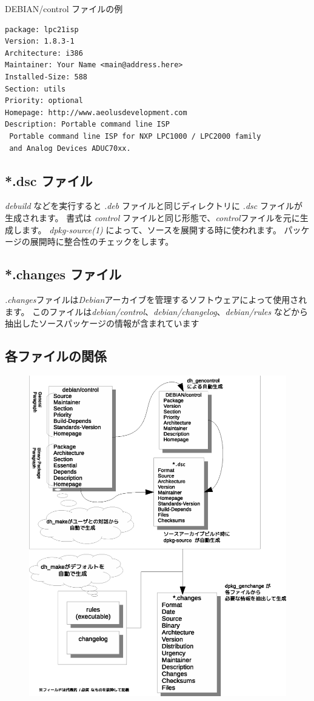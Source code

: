 \documentclass[mingoth,a4paper]{jsarticle}
\begin{document}
\begin{itembox}[l]{DEBIAN/control ファイルの例}
\begin{verbatim}
package: lpc21isp
Version: 1.8.3-1
Architecture: i386
Maintainer: Your Name <main@address.here>
Installed-Size: 588
Section: utils
Priority: optional
Homepage: http://www.aeolusdevelopment.com
Description: Portable command line ISP
 Portable command line ISP for NXP LPC1000 / LPC2000 family
 and Analog Devices ADUC70xx.
\end{verbatim}
\end{itembox}

\subsection{*.dsc ファイル}
{\it debuild} などを実行すると {\it *.deb} ファイルと同じディレクトリに {\it *.dsc}
ファイルが生成されます。
書式は {\it control} ファイルと同じ形態で、{\it control}ファイルを元に生成します。
{\it dpkg-source(1)} によって、ソースを展開する時に使われます。
パッケージの展開時に整合性のチェックをします。

\subsection{*.changes ファイル}
{\it .changes}ファイルは{\it Debian}アーカイブを管理するソフトウェアによって使用されます。
このファイルは{\it debian/control}、{\it debian/changelog}、{\it debian/rules} などから
抽出したソースパッケージの情報が含まれています
\clearpage
\subsection{各ファイルの関係}
\begin{figure}[h]
    \centering
    \includegraphics[width=.9\textwidth]{image201203/control.eps}
\end{figure}
\end{document}
